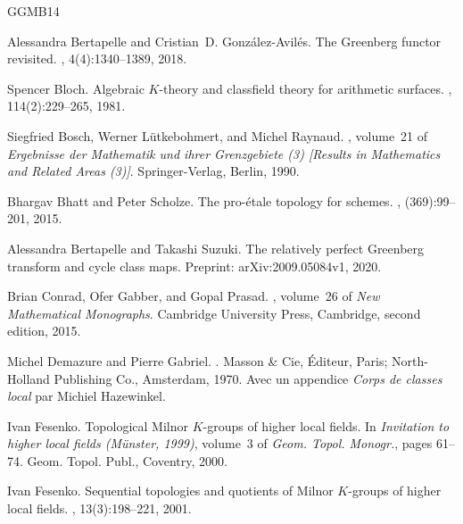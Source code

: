 \documentclass{amsart}
\theoremstyle{remark}
\numberwithin{equation}{section}
\begin{document}

\begin{thebibliography}{GGMB14}

Alessandra Bertapelle and Cristian~D. Gonz\'{a}lez-Avil\'{e}s.
\newblock The {G}reenberg functor revisited.
, 4(4):1340--1389, 2018.

Spencer Bloch.
\newblock Algebraic {$K$}-theory and classfield theory for arithmetic surfaces.
, 114(2):229--265, 1981.

Siegfried Bosch, Werner L{\"u}tkebohmert, and Michel Raynaud.
, volume~21 of {\em Ergebnisse der Mathematik und
  ihrer Grenzgebiete (3) [Results in Mathematics and Related Areas (3)]}.
\newblock Springer-Verlag, Berlin, 1990.

Bhargav Bhatt and Peter Scholze.
\newblock The pro-\'etale topology for schemes.
, (369):99--201, 2015.

Alessandra Bertapelle and Takashi Suzuki.
\newblock The relatively perfect {G}reenberg transform and cycle class maps.
\newblock Preprint: arXiv:2009.05084v1, 2020.

Brian Conrad, Ofer Gabber, and Gopal Prasad.
, volume~26 of {\em New Mathematical
  Monographs}.
\newblock Cambridge University Press, Cambridge, second edition, 2015.

Michel Demazure and Pierre Gabriel.
.
\newblock Masson \& Cie, \'Editeur, Paris; North-Holland Publishing Co.,
  Amsterdam, 1970.
\newblock Avec un appendice {\it Corps de classes local} par Michiel
  Hazewinkel.

Ivan Fesenko.
\newblock Topological {M}ilnor {$K$}-groups of higher local fields.
\newblock In {\em Invitation to higher local fields ({M}\"{u}nster, 1999)},
  volume~3 of {\em Geom. Topol. Monogr.}, pages 61--74. Geom. Topol. Publ.,
  Coventry, 2000.

Ivan Fesenko.
\newblock Sequential topologies and quotients of {M}ilnor {$K$}-groups of
  higher local fields.
, 13(3):198--221, 2001.


\end{thebibliography}
\end{document}
